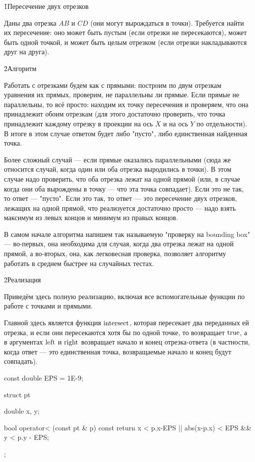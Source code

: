 \h1{Пересечение двух отрезков}

Даны два отрезка $AB$ и $CD$ (они могут вырождаться в точки). Требуется найти их пересечение: оно может быть пустым (если отрезки не пересекаются), может быть одной точкой, и может быть целым отрезком (если отрезки накладываются друг на друга).


\h2{Алгоритм}

Работать с отрезками будем как с прямыми: построим по двум отрезкам уравнения их прямых, проверим, не параллельны ли прямые. Если прямые не параллельны, то всё просто: находим их точку пересечения и проверяем, что она принадлежит обоим отрезкам (для этого достаточно проверить, что точка принадлежит каждому отрезку в проекции на ось $X$ и на ось $Y$ по отдельности). В итоге в этом случае ответом будет либо "пусто", либо единственная найденная точка.

Более сложный случай --- если прямые оказались параллельными (сюда же относится случай, когда один или оба отрезка выродились в точки). В этом случае надо проверить, что оба отрезка лежат на одной прямой (или, в случае когда они оба вырождены в точку --- что эта точка совпадает). Если это не так, то ответ --- "пусто". Если это так, то ответ --- это пересечение двух отрезков, лежащих на одной прямой, что реализуется достаточно просто --- надо взять максимум из левых концов и минимум из правых концов.

В самом начале алгоритма напишем так называемую "проверку на bounding box" --- во-первых, она необходима для случая, когда два отрезка лежат на одной прямой, а во-вторых, она, как легковесная проверка, позволяет алгоритму работать в среднем быстрее на случайных тестах.


\h2{Реализация}

Приведём здесь полную реализацию, включая все вспомогательные функции по работе с точками и прямыми.

Главной здесь является функция $\rm intersect$, которая пересекает два переданных ей отрезка, и если они пересекаются хотя бы по одной точке, то возвращает $\rm true$, а в аргументах $\rm left$ и $\rm right$ возвращает начало и конец отрезка-ответа (в частности, когда ответ --- это единственная точка, возвращаемые начало и конец будут совпадать).

\code
const double EPS = 1E-9;

struct pt {
	double x, y;

	bool operator< (const pt & p) const {
		return x < p.x-EPS || abs(x-p.x) < EPS && y < p.y - EPS;
	}
};

